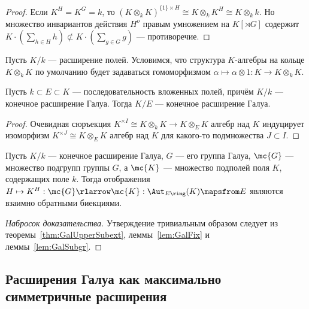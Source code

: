 \documentclass[
	extrafontsizes,
	11pt,
	hyphens,
]{memoir}
\begin{document}
\begin{proof}
Если \(K^H = K^G = k\),
то \((K \otimes_k K)^{\{1\} \times H} \cong K \otimes_k K^H \cong K \otimes_k k\).
Но множество инвариантов действия \(H^o\) правым умножением на \(K[\rtimes G]\) содержит \(K \cdot{} (\sum_{h \in H} h) \not\subset K \cdot{} (\sum_{g \in G} g)\) --- противоречие.
\end{proof}

\begin{convention}
Пусть \(K/k\) --- расширение полей. Условимся, что структура \(K\)-алгебры на кольце \(K \otimes_k K\) по умолчанию будет задаваться гомоморфизмом \(\alpha \mapsto \alpha \otimes 1 : K \to K \otimes_k K\).
\end{convention}

\begin{theorem} \label{thm:GalUpperSubext}
Пусть \(k \subset E \subset K\) --- последовательность вложенных полей, причём \(K/k\) --- конечное расширение Галуа.
Тогда \(K/E\) --- конечное расширение Галуа.
\end{theorem}

\begin{proof}
Очевидная сюръекция \(K^{\times I} \cong K \otimes_k K \to K \otimes_E K\) алгебр над \(K\) индуцирует изоморфизм \(K^{\times J} \cong K \otimes_E K\) алгебр над \(K\) для какого-то подмножества \(J \subset I\).
\end{proof}

\begin{theorem}
Пусть \(K/k\) --- конечное расширение Галуа, \(G\) --- его группа Галуа, \(\mc{G}\) --- множество подгрупп группы \(G\),
а \(\mc{K}\) --- множество подполей поля \(K\), содержащих поле \(k\).
Тогда отображения
\(H \mapsto K^H : \mc{G} \rlarrow \mc{K} : \Aut_{E\ring}(K) \mapsfrom E\)
являются взаимно обратными биекциями.
\end{theorem}

\begin{proof}[Набросок доказательства]
Утверждение тривиальным образом следует из теоремы~\ref{thm:GalUpperSubext}, леммы~\ref{lem:GalFix} и леммы~\ref{lem:GalSubgr}.
\end{proof}

\subsection{Расширения Галуа как максимально симметричные расширения}

\end{document}
